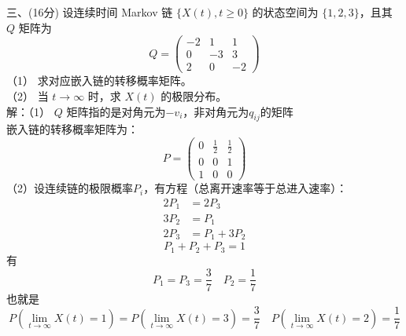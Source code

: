 \documentclass[UTF8]{ctexart}
\begin{document}
\noindent 三、(16分) 设连续时间 Markov 链 $\{X(t), t \geq 0\}$ 的状态空间为 $\{1,2,3\}$，且其 $Q$ 矩阵为
\[
Q = 
\begin{pmatrix}
-2 & 1 & 1 \\
0 & -3 & 3 \\
2 & 0 & -2
\end{pmatrix}
\]
（1） 求对应嵌入链的转移概率矩阵。\\
（2） 当 $t \to \infty$ 时，求 $X(t)$ 的极限分布。\\
解：（1） $Q$ 矩阵指的是对角元为$-v_i$，非对角元为$q_{ij}$的矩阵\\
嵌入链的转移概率矩阵为：
\[
P=
\begin{pmatrix}
	0 & \frac{1}{2} & \frac{1}{2} \\
	0 & 0 & 1 \\
	1 & 0 & 0
\end{pmatrix}
\]
（2）设连续链的极限概率$P_i$，有方程（总离开速率等于总进入速率）：\\
$$
\begin{aligned}
	 2P_1& =2P_3 \\
	3P_2 & =P_1\\
	2P_3&=P_1+3P_2
\end{aligned}
$$
\[
P_1+P_2+P_3=1
\]
有
\[
P_1=P_3=\frac{3}{7} \quad P_2=\frac{1}{7}
\]
也就是
\[
P(\lim_{t\rightarrow \infty} X(t)=1)=P(\lim_{t\rightarrow \infty} X(t)=3)=\frac{3}{7} \quad P(\lim_{t\rightarrow \infty} X(t)=2)=\frac{1}{7}
\]\\
\end{document}
